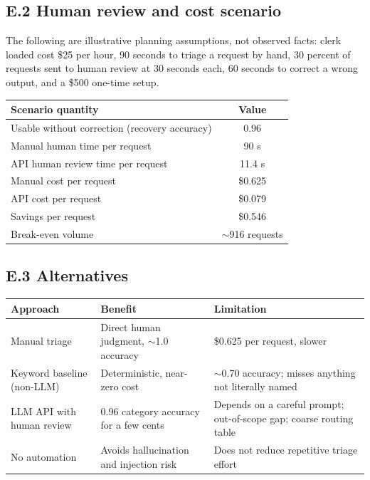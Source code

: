 \documentclass[11pt]{article}
\begin{document}
\subsection*{E.2 Human review and cost scenario}
The following are illustrative planning assumptions, not observed facts: clerk loaded cost \$25 per hour, 90 seconds to triage a request by hand, 30 percent of requests sent to human review at 30 seconds each, 60 seconds to correct a wrong output, and a \$500 one-time setup.

\begin{center}
\small
\begin{tabularx}{\textwidth}{X c}
\toprule
\textbf{Scenario quantity} & \textbf{Value} \\
\midrule
Usable without correction (recovery accuracy) & 0.96 \\
Manual human time per request & 90 s \\
API human review time per request & 11.4 s \\
Manual cost per request & \$0.625 \\
API cost per request & \$0.079 \\
Savings per request & \$0.546 \\
Break-even volume & $\sim$916 requests \\
\bottomrule
\end{tabularx}
\end{center}

\subsection*{E.3 Alternatives}
\begin{center}
\small
\begin{tabularx}{\textwidth}{L{3.4cm} X X}
\toprule
\textbf{Approach} & \textbf{Benefit} & \textbf{Limitation} \\
\midrule
Manual triage & Direct human judgment, $\sim$1.0 accuracy & \$0.625 per request, slower \\
Keyword baseline (non-LLM) & Deterministic, near-zero cost & $\sim$0.70 accuracy; misses anything not literally named \\
LLM API with human review & 0.96 category accuracy for a few cents & Depends on a careful prompt; out-of-scope gap; coarse routing table \\
No automation & Avoids hallucination and injection risk & Does not reduce repetitive triage effort \\
\bottomrule
\end{tabularx}
\end{center}
\end{document}
